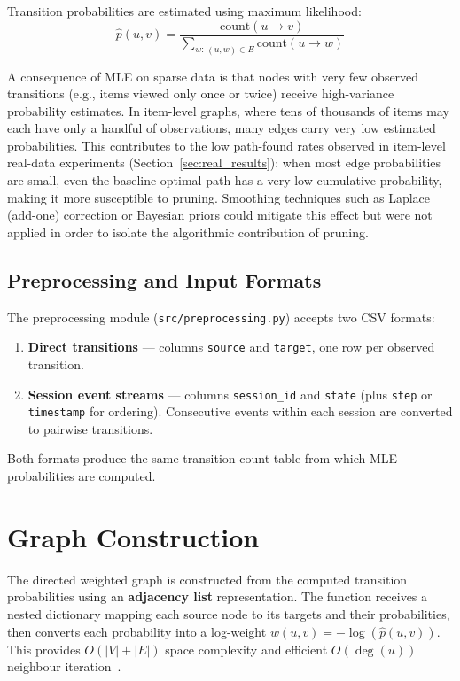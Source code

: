 Transition probabilities are estimated using maximum likelihood:
\[
\hat{p}(u,v) = \frac{\text{count}(u \to v)}{\displaystyle\sum_{w:\,(u,w)\in E} \text{count}(u \to w)}
\]

\noindent A consequence of MLE on sparse data is that nodes with very few observed transitions (e.g., items viewed only once or twice) receive high-variance probability estimates. In item-level graphs, where tens of thousands of items may each have only a handful of observations, many edges carry very low estimated probabilities. This contributes to the low path-found rates observed in item-level real-data experiments (Section~\ref{sec:real_results}): when most edge probabilities are small, even the baseline optimal path has a very low cumulative probability, making it more susceptible to pruning. Smoothing techniques such as Laplace (add-one) correction or Bayesian priors could mitigate this effect but were not applied in order to isolate the algorithmic contribution of pruning.

\subsection{Preprocessing and Input Formats}

The preprocessing module (\texttt{src/preprocessing.py}) accepts two CSV formats:

\begin{enumerate}
    \item \textbf{Direct transitions} --- columns \texttt{source} and \texttt{target}, one row per observed transition.
    \item \textbf{Session event streams} --- columns \texttt{session\_id} and \texttt{state} (plus \texttt{step} or \texttt{timestamp} for ordering). Consecutive events within each session are converted to pairwise transitions.
\end{enumerate}

Both formats produce the same transition-count table from which MLE probabilities are computed.

\section{Graph Construction}

The directed weighted graph is constructed from the computed transition probabilities using an \textbf{adjacency list} representation. The function receives a nested dictionary mapping each source node to its targets and their probabilities, then converts each probability into a log-weight $w(u,v) = -\log(\hat{p}(u,v))$. This provides $O(|V|+|E|)$ space complexity and efficient $O(\deg(u))$ neighbour iteration~\citep{cormen2009}.

